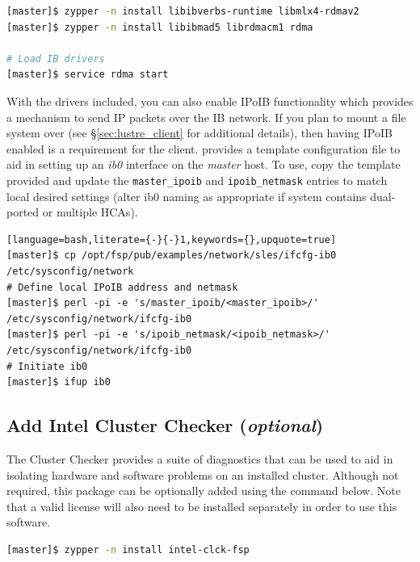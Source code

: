 \documentclass[letterpaper]{article}
\begin{document}
\begin{lstlisting}[language=bash,keywords={}]
[master]$ zypper -n install libibverbs-runtime libmlx4-rdmav2
[master]$ zypper -n install libibmad5 librdmacm1 rdma

# Load IB drivers
[master]$ service rdma start
\end{lstlisting}

With the \InfiniBand{} drivers included, you can also enable IPoIB functionality
which provides a mechanism to send IP packets over the IB network. If you plan
to mount a \Lustre{} file system over \InfiniBand{} (see \S\ref{sec:lustre_client}
for additional details), then having IPoIB enabled is a requirement for the
\Lustre{} client. \FSP{} provides a template configuration file to aid in setting up
an {\em ib0} interface on the {\em master} host. To use, copy the template
provided and update the \texttt{master\_ipoib} and
\texttt{ipoib\_netmask} entries to match local desired settings (alter ib0
naming as appropriate if system contains dual-ported or multiple HCAs). 

\begin{lstlisting}[language=bash,literate={-}{-}1,keywords={},upquote=true]
[master]$ cp /opt/fsp/pub/examples/network/sles/ifcfg-ib0 /etc/sysconfig/network
# Define local IPoIB address and netmask
[master]$ perl -pi -e 's/master_ipoib/<master_ipoib>/' /etc/sysconfig/network/ifcfg-ib0
[master]$ perl -pi -e 's/ipoib_netmask/<ipoib_netmask>/' /etc/sysconfig/network/ifcfg-ib0
# Initiate ib0
[master]$ ifup ib0
\end{lstlisting}

\subsection{Add Intel Cluster Checker ({\em optional})} \label{sec:add_clck}

The \Intel{} Cluster Checker provides a suite of diagnostics that can be used to
aid in isolating hardware and software problems on an installed
cluster. Although not required, this package can be optionally added using the
command below. Note that a valid license will also need to be installed
separately in order to use this software.

\begin{lstlisting}[language=bash,keywords={}]
[master]$ zypper -n install intel-clck-fsp
\end{lstlisting}
\end{document}
